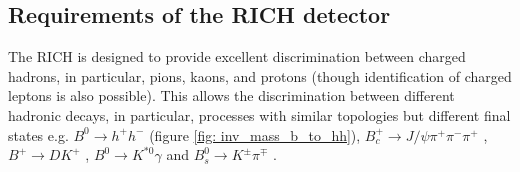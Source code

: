 \subsection*{Requirements of the RICH detector}
The RICH is designed to provide excellent discrimination between charged hadrons, in particular, pions, kaons, and protons (though identification of charged leptons is also possible). This allows the discrimination between different hadronic decays, in particular, processes with similar topologies but different final states e.g. $B^0 \rightarrow h^+h^-$ \cite{JHEP10(2012)037} (figure \ref{fig: inv_mass_b_to_hh}), $B_c^+ \rightarrow J/\psi \pi^+\pi^-\pi^+$ \cite{PhysRevLett.108.251802},  $B^+ \rightarrow DK^+$ \cite{Aaij2012203}, $B^0\rightarrow K^{*0}\gamma$ \cite{PhysRevD.85.112013} and $B_s^0 \rightarrow K^\pm \pi^\mp$ \cite{PhysRevLett.108.201601}.

